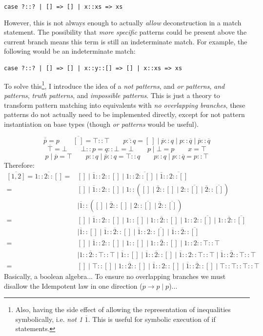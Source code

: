 \texttt{case ?::? | [] => [] | x::xs => xs}

However, this is not always enough to actually \textit{allow} deconstruction in a match statement. The possibility that \textit{more specific} patterns could be present above the current branch means this term is still an indeterminate match. For example, the following would be an indeterminate match:

\texttt{case ?::? | [] => [] | x::y::[] => [] | x::xs => xs}

To solve this\footnote{Also, having the side effect of allowing the representation of inequalities symbolically, i.e. \textit{not 1} $\overline{1}$. This is useful for symbolic execution of if statements.}, I introduce the idea of a \textit{not patterns}, and \textit{or patterns}, \textit{and patterns}, \textit{truth patterns}, and \textit{impossible patterns}. This is just a theory to transform pattern matching into equivalents with \textit{no overlapping branches}, these patterns do not actually need to be implemented directly, except for not pattern instantiation on base types (though \textit{or patterns} would be useful).

\[\overline{\overline{p}} = p \qquad \overline{[\ ]} = \top::\top \qquad \overline{p :: q} = [\ ] \mid \overline{p}::q \mid p::\overline{q} \mid \overline{p} :: \overline{q}\]
\[\overline{\top} = \bot \qquad \bot :: p = q :: \bot = \bot \qquad p \mid \bot = p \qquad x = \top\]
\[ p \mid \overline{p} = \top \qquad p :: q \mid \overline{p} :: q = \top ::q \qquad p :: q \mid p :: \overline{q} = p::\top\]
Therefore: 
{\tiny
\begin{align*}
\overline{[1,2]} = \overline{1::2::[]} = &[] \mid \overline{1} :: 2::[] \mid 1 :: \overline{2 :: []} \mid \overline{1} :: \overline{2::[]}\\
= &[] \mid \overline{1} :: 2::[] \mid 1 :: ([] \mid \overline{2} :: [] \mid 2 :: \overline{[]} \mid \overline{2} :: \overline{[]}) \\
&\mid \overline{1} :: ([] \mid \overline{2} :: [] \mid 2 :: \overline{[]} \mid \overline{2} :: \overline{[]})\\
= &[] \mid \overline{1} :: 2::[] \mid 1 :: [] \mid 1 :: \overline{2} :: [] \mid 1::2 :: \overline{[]} \mid 1::\overline{2} :: \overline{[]}\\
&\mid \overline{1} :: [] \mid \overline{1} ::\overline{2} :: [] \mid \overline{1} ::2 :: \overline{[]} \mid \overline{1} ::\overline{2} :: \overline{[]}\\
= &[] \mid \overline{1} :: 2::[] \mid 1 :: [] \mid 1 :: \overline{2} :: [] \mid 1::2 :: \top::\top\\
&\mid 1::\overline{2} :: \top::\top \mid \overline{1} :: [] \mid \overline{1} ::\overline{2} :: [] \mid \overline{1} ::2 :: \top::\top \mid \overline{1} ::\overline{2} :: \top :: \top\\
= &[] \mid \top::[] \mid 1::\overline{2}::[] \mid \overline{1}::2::[] \mid \overline{1}::\overline{2}::[] \mid \top::\top::\top::\top
\end{align*}
}
Basically, a boolean algebra... To ensure no overlapping branches we must disallow the Idempotent law in one direction ($p \to p \mid p$)...

